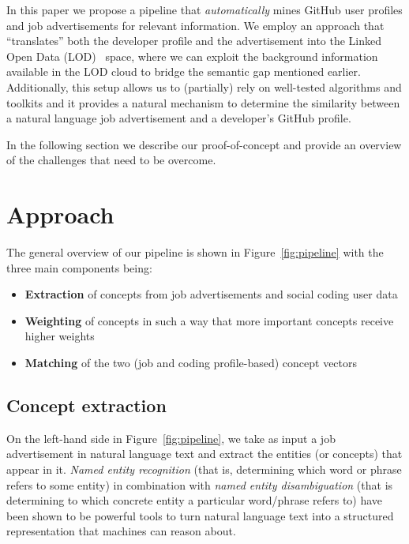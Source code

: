 \documentclass[conference]{IEEEtran}
\begin{document}
In this paper we propose a pipeline that \emph{automatically} mines GitHub user
profiles and job advertisements for relevant information. We employ an approach
that ``translates'' both the developer profile and the advertisement into the
Linked Open Data (LOD)~\cite{bizer2009linked} space, where we can exploit the
background information available in the LOD cloud to bridge the semantic gap
mentioned earlier. Additionally, this setup allows us to (partially) rely on
well-tested algorithms and toolkits and it provides a natural mechanism to
determine the similarity between a natural language job advertisement and a
developer's GitHub profile.

In the following section we describe our proof-of-concept and provide an
overview of the challenges that need to be overcome.


\section{Approach}

The general overview of our pipeline is shown in Figure~\ref{fig:pipeline} with
the three main components being:

\begin{itemize}

  \item \textbf{Extraction} of concepts from job advertisements and social
    coding user data

  \item \textbf{Weighting} of concepts in such a way that more important
    concepts receive higher weights

  \item \textbf{Matching} of the two (job and coding profile-based) concept
    vectors

\end{itemize}

\subsection{Concept extraction}

On the left-hand side in Figure~\ref{fig:pipeline}, we take as input a job
advertisement in natural language text and extract the entities (or concepts)
that appear in it. \emph{Named entity recognition} (that is, determining which
word or phrase refers to some entity) in combination with \emph{named entity
disambiguation} (that is determining to which concrete entity a particular
word/phrase refers to) have been shown to be powerful tools to turn natural
language text into a structured representation that machines can reason about.
\end{document}
